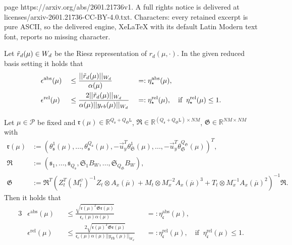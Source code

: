 \documentclass[10pt,a4paper]{amsart}
\newcommand{\RBestCcABS}{\eta_\mathfrak{c}^\text{abs}}
\newcommand{\RBestCcREL}{\eta_\mathfrak{c}^\text{rel}}
\newcommand{\RBestFineABS}{\eta_\star^\text{abs}}
\newcommand{\RBestFineREL}{\eta_\star^\text{rel}}
\newcommand{\RR}{\mathbb{R}}
\begin{document}
page https://arxiv.org/abs/2601.21736v1. A full rights notice is delivered at licenses/arxiv-2601.21736-CC-BY-4.0.txt. Characters: every retained excerpt is pure ASCII, so the delivered engine, XeLaTeX with its default Latin Modern text font, reports no missing character.
\begin{theorem}\label{thm:RBerror_ex}
Let $\Tilde{r}_d(\mu) \in W_d$ be the Riesz representation of $r_d(\mu, \cdot)$. In the given reduced basis setting it holds that
\begin{alignat}{3} \label{eq:RB_first_abs_est}
    &\epsilon^\text{abs}(\mu) &&\leq \frac{\vert \vert \Tilde{r}_d(\mu) \vert \vert _{W_d}}{\alpha(\mu)} &&=: \RBestFineABS(\mu), \\
    &\epsilon^\text{rel}(\mu) &&\leq \frac{2\vert \vert \Tilde{r}_d(\mu) \vert \vert _{W_d}}{\alpha(\mu)\vert \vert y_{\texttt{rb}}(\mu) \vert \vert _{W_d}} &&=: \RBestFineREL(\mu), \quad \text{if} \; \; \RBestFineREL(\mu) \leq 1 . \label{eq:RB_first_rel_est}
\end{alignat}
\end{theorem}

\begin{theorem}\label{thm:RB_error_est_cc_sq} 
Let $\mu \in \mathcal{P}$ be fixed and $\mathfrak{r}(\mu) \in \RR^{Q_{\mathfrak{s}}+Q_{\mathfrak{S}}\texttt{L}}$, $\mathfrak{R} \in \RR^{(Q_{\mathfrak{s}}+Q_{\mathfrak{S}}\texttt{L}) \times NM}$, $\mathfrak{G} \in \RR^{NM\times NM}$ with
\begin{align}\label{eq:residualRBparameterpart}
    \mathfrak{r}(\mu) &:= \left(\theta_{\mathfrak{s}}^{1}(\mu), ..., \theta_{\mathfrak{s}}^{Q_{\mathfrak{s}}}(\mu), -\Vec{u}_{y}^T\theta_{\mathfrak{S}}^{1}(\mu), ..., -\Vec{u}_{y}^T\theta_{\mathfrak{S}}^{Q_{\mathfrak{S}}}(\mu)\right)^T , \\
    \mathfrak{R} &:= \left(\mathfrak{s}_{1}, ...,  \mathfrak{s}_{Q_{\mathfrak{s}}}, \mathfrak{S}_{1}B_W, ..., \mathfrak{S}_{Q_{\mathfrak{S}}}B_W\right) , \\
    \mathfrak{G} &:= \mathfrak{R}^T\left(Z_t^T (M_t^\psi)^{-1} Z_t \otimes A_{x}(\overline{\mu}) + M_{t} \otimes M_{x}^{-2} A_{x}(\overline{\mu})^3 + T_t \otimes M_x^{-1}A_x(\overline{\mu})^2\right)^{-1}\mathfrak{R} .\label{eq:residualRBotherpart}
\end{align} 
Then it holds that
\begin{alignat}{3}\label{eq:rbabsestnew}
    &\epsilon^\text{abs}(\mu) &&\leq \frac{\sqrt{\mathfrak{r}(\mu)^T \mathfrak{G} \mathfrak{r}(\mu)}}{\mathfrak{c}_c(\mu) \alpha(\mu)} &&=: \RBestCcABS(\mu) , \\
    &\epsilon^\text{rel}(\mu) &&\leq \frac{2 \sqrt{\mathfrak{r}(\mu)^T \mathfrak{G} \mathfrak{r}(\mu)}}{\mathfrak{c}_c(\mu) \alpha(\mu)\vert \vert y_{\texttt{rb}}(\mu) \vert \vert _{W_d}} &&=: \RBestCcREL(\mu), \quad \text{if} \; \; \RBestCcREL(\mu) \leq 1 .
\end{alignat}
\end{theorem}
\end{document}
